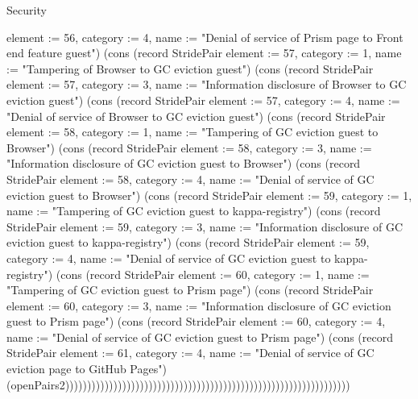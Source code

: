\begin{lexlean}{Security}
\begin{semanticmodule}
{{element := 56, category := 4, name := "Denial of service of Prism page to Front end feature guest"}) (cons (record StridePair {element := 57, category := 1, name := "Tampering of Browser to GC eviction guest"}) (cons (record StridePair {element := 57, category := 3, name := "Information disclosure of Browser to GC eviction guest"}) (cons (record StridePair {element := 57, category := 4, name := "Denial of service of Browser to GC eviction guest"}) (cons (record StridePair {element := 58, category := 1, name := "Tampering of GC eviction guest to Browser"}) (cons (record StridePair {element := 58, category := 3, name := "Information disclosure of GC eviction guest to Browser"}) (cons (record StridePair {element := 58, category := 4, name := "Denial of service of GC eviction guest to Browser"}) (cons (record StridePair {element := 59, category := 1, name := "Tampering of GC eviction guest to kappa-registry"}) (cons (record StridePair {element := 59, category := 3, name := "Information disclosure of GC eviction guest to kappa-registry"}) (cons (record StridePair {element := 59, category := 4, name := "Denial of service of GC eviction guest to kappa-registry"}) (cons (record StridePair {element := 60, category := 1, name := "Tampering of GC eviction guest to Prism page"}) (cons (record StridePair {element := 60, category := 3, name := "Information disclosure of GC eviction guest to Prism page"}) (cons (record StridePair {element := 60, category := 4, name := "Denial of service of GC eviction guest to Prism page"}) (cons (record StridePair {element := 61, category := 4, name := "Denial of service of GC eviction page to GitHub Pages"}) (openPairs2)))))))))))))))))))))))))))))))))))))))))))))))))))))))))))))))))
}


\end{semanticmodule}
\end{lexlean}
